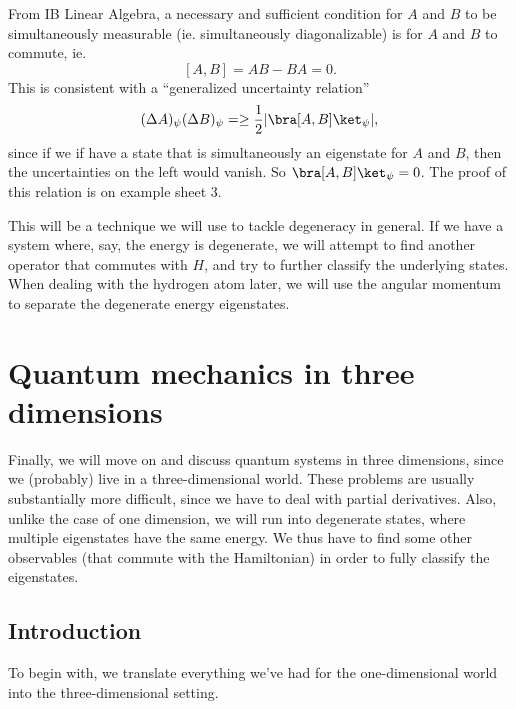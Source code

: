 \documentclass[a4paper]{article}
\begin{document}
From IB Linear Algebra, a necessary and sufficient condition for $A$ and $B$ to be simultaneously measurable (ie. simultaneously diagonalizable) is for $A$ and $B$ to commute, ie.
\[
  [A, B] = AB - BA = 0.
\]
This is consistent with a ``generalized uncertainty relation''
\[
  (\Delta A)_\psi (\Delta B)_\psi =\geq \frac{1}{2} |\bra [A, B]\ket_\psi|,
\]
since if we if have a state that is simultaneously an eigenstate for $A$ and $B$, then the uncertainties on the left would vanish. So $\bra [A, B]\ket_\psi = 0$. The proof of this relation is on example sheet 3.

This will be a technique we will use to tackle degeneracy in general. If we have a system where, say, the energy is degenerate, we will attempt to find another operator that commutes with $H$, and try to further classify the underlying states. When dealing with the hydrogen atom later, we will use the angular momentum to separate the degenerate energy eigenstates.

\section{Quantum mechanics in three dimensions}
Finally, we will move on and discuss quantum systems in three dimensions, since we (probably) live in a three-dimensional world. These problems are usually substantially more difficult, since we have to deal with partial derivatives. Also, unlike the case of one dimension, we will run into degenerate states, where multiple eigenstates have the same energy. We thus have to find some other observables (that commute with the Hamiltonian) in order to fully classify the eigenstates.

\subsection{Introduction}
To begin with, we translate everything we've had for the one-dimensional world into the three-dimensional setting.
\end{document}
